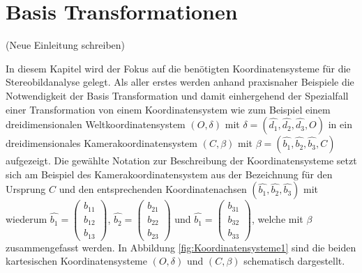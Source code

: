 \chapter{Basis Transformationen }
\label{sec:basisTransformation} 

(Neue Einleitung schreiben)
 
In diesem Kapitel wird der Fokus auf die benötigten Koordinatensysteme für die Stereobildanalyse gelegt. Als aller erstes werden anhand praxisnaher Beispiele die Notwendigkeit der Basis Transformation und damit einhergehend der Spezialfall einer Transformation von einem Koordinatensystem wie zum Beispiel einem dreidimensionalen Weltkoordinatensystem $(O,\delta)$ mit $\delta=(\hat{d_1}, \hat{d_2},\hat{d_3},O)$ in ein dreidimensionales Kamerakoordinatensystem $(C,\beta)$ mit $\beta=(\hat{b_1},\hat{b_2},\hat{b_3},C)$ aufgezeigt. Die gewählte Notation zur Beschreibung der Koordinatensysteme setzt sich am Beispiel des Kamerakoordinatensystem aus der Bezeichnung für den Ursprung $C$ und den entsprechenden Koordinatenachsen $(\hat{b_1},\hat{b_2},\hat{b_3})$ mit wiederum $\hat{b_1} = \begin{pmatrix}b_{11}\\b_{12}\\b_{13}\end{pmatrix}$, $\hat{b_2} = \begin{pmatrix}b_{21}\\b_{22}\\b_{23}\end{pmatrix}$ und $\hat{b_1} = \begin{pmatrix}b_{31}\\b_{32}\\b_{33}\end{pmatrix}$, welche mit $\beta$ zusammengefasst werden. In Abbildung \ref{fig:Koordinatensysteme1} sind die beiden kartesischen Koordinatensysteme $(O,\delta)$ und $(C,\beta)$ schematisch dargestellt. 

%
%
%

